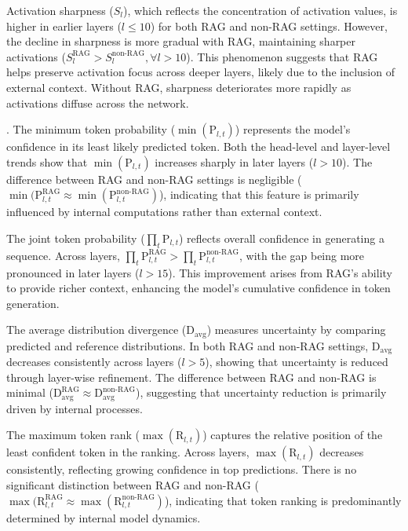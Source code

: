 Activation sharpness (\(S_l\)), which reflects the concentration of activation values, is higher in earlier layers (\(l \leq 10\)) for both RAG and non-RAG settings. However, the decline in sharpness is more gradual with RAG, maintaining sharper activations (\(S_l^{\text{RAG}} > S_l^{\text{non-RAG}}, \forall l > 10\)). This phenomenon suggests that RAG helps preserve activation focus across deeper layers, likely due to the inclusion of external context. Without RAG, sharpness deteriorates more rapidly as activations diffuse across the network.

.  
The minimum token probability (\(\min(\text{P}_{l,t})\)) represents the model's confidence in its least likely predicted token. Both the head-level and layer-level trends show that \(\min(\text{P}_{l,t})\) increases sharply in later layers (\(l > 10\)). The difference between RAG and non-RAG settings is negligible (\(\min(\text{P}_{l,t}^{\text{RAG}} \approx \min(\text{P}_{l,t}^{\text{non-RAG}})\)), indicating that this feature is primarily influenced by internal computations rather than external context.

The joint token probability (\(\prod_t \text{P}_{l,t}\)) reflects overall confidence in generating a sequence. Across layers, \(\prod_t \text{P}_{l,t}^{\text{RAG}} > \prod_t \text{P}_{l,t}^{\text{non-RAG}}\), with the gap being more pronounced in later layers (\(l > 15\)). This improvement arises from RAG's ability to provide richer context, enhancing the model's cumulative confidence in token generation.

The average distribution divergence (\(\text{D}_{\text{avg}}\)) measures uncertainty by comparing predicted and reference distributions. In both RAG and non-RAG settings, \(\text{D}_{\text{avg}}\) decreases consistently across layers (\(l > 5\)), showing that uncertainty is reduced through layer-wise refinement. The difference between RAG and non-RAG is minimal (\(\text{D}_{\text{avg}}^{\text{RAG}} \approx \text{D}_{\text{avg}}^{\text{non-RAG}}\)), suggesting that uncertainty reduction is primarily driven by internal processes.

The maximum token rank (\(\max(\text{R}_{l,t})\)) captures the relative position of the least confident token in the ranking. Across layers, \(\max(\text{R}_{l,t})\) decreases consistently, reflecting growing confidence in top predictions. There is no significant distinction between RAG and non-RAG (\(\max(\text{R}_{l,t}^{\text{RAG}} \approx \max(\text{R}_{l,t}^{\text{non-RAG}})\)), indicating that token ranking is predominantly determined by internal model dynamics.



